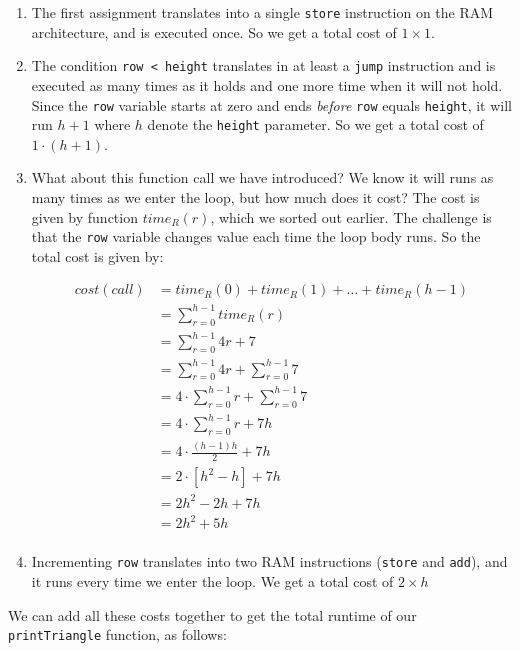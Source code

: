 \documentclass[11pt]{article}
\begin{document}
\begin{enumerate}
\item The first assignment translates into a single \texttt{store} instruction
on the RAM architecture, and is executed once. So we get a total
cost of \(1 \times 1\).

\item The condition \texttt{row < height} translates in at least a \texttt{jump}
instruction and is executed as many times as it holds and one more
time when it will not hold. Since the \texttt{row} variable starts at
zero and ends \emph{before} \texttt{row} equals \texttt{height}, it will run \(h + 1\)
where \(h\) denote the \texttt{height} parameter. So we get a total cost
of \(1 \cdot (h+1)\).

\item What about this function call we have introduced? We know it will
runs as many times as we enter the loop, but how much does it
cost?  The cost is given by function \(time_R(r)\), which we sorted
out earlier. The challenge is that the \texttt{row} variable changes
value each time the loop body runs. So the total cost is given
by:

\begin{align*}
    cost(call) & = time_R(0) + time_R(1) + \ldots + time_R(h-1) \\
        & = \sum_{r=0}^{h-1} time_R(r) \\
        & = \sum_{r=0}^{h-1} 4r + 7 \\
        & = \sum_{r=0}^{h-1} 4r + \sum_{r=0}^{h-1} 7 \\
        & = 4 \cdot \sum_{r=0}^{h-1} r + \sum_{r=0}^{h-1} 7 \\
        & = 4 \cdot \sum_{r=0}^{h-1} r + 7h \\
        & = 4 \cdot \frac{(h-1)h}{2} + 7h \\
        & = 2 \cdot [h^2 - h] + 7h \\
        & = 2h^2 - 2h + 7h \\
        & = 2h^2 + 5h \\
\end{align*}

\item Incrementing \texttt{row} translates into two RAM instructions (\texttt{store}
and \texttt{add}), and it runs every time we enter the loop. We get a total
cost of \(2 \times h\)
\end{enumerate}

We can add all these costs together to get the total runtime of our
\texttt{printTriangle} function, as follows:
\end{document}
